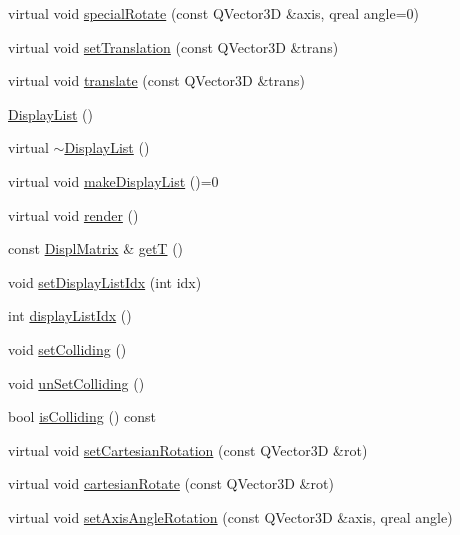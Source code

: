 \begin{DoxyCompactItemize}
\item 
virtual void \hyperlink{class_robot_model_1_1_display_list_abd15964fcf47dbfdcb06d89517871152}{specialRotate} (const QVector3D \&axis, qreal angle=0)
\item 
virtual void \hyperlink{class_robot_model_1_1_display_list_a6c9c1298e237ab25037ad9d7163b118c}{setTranslation} (const QVector3D \&trans)
\item 
virtual void \hyperlink{class_robot_model_1_1_display_list_a6eb574d1f9929d9e2141dbacdeeb1b6a}{translate} (const QVector3D \&trans)
\item 
\hyperlink{class_robot_model_1_1_display_list_a4791b78bf5b3ce2edb821fd9318b7117}{DisplayList} ()
\item 
virtual \hyperlink{class_robot_model_1_1_display_list_a4f3dfbc4d5278bf34ce02738a55af6b7}{$\sim$DisplayList} ()
\item 
virtual void \hyperlink{class_robot_model_1_1_display_list_a842de97924298c7363e50aebd69e5a50}{makeDisplayList} ()=0
\item 
virtual void \hyperlink{class_robot_model_1_1_display_list_ae1e118fc2339bdcaed1f39bd3b65ab32}{render} ()
\item 
const \hyperlink{class_robot_model_1_1_displ_matrix}{DisplMatrix} \& \hyperlink{class_robot_model_1_1_display_list_a2e08e72148fc8bb77a693b769a16711a}{getT} ()
\item 
void \hyperlink{class_robot_model_1_1_display_list_a78c642f12487ea830475a0e860aeee38}{setDisplayListIdx} (int idx)
\item 
int \hyperlink{class_robot_model_1_1_display_list_a2c405729d9a5d904b9c292fd87c3be05}{displayListIdx} ()
\item 
void \hyperlink{class_robot_model_1_1_display_list_aab3355867d2a992c208f2173fc29e221}{setColliding} ()
\item 
void \hyperlink{class_robot_model_1_1_display_list_a7440037838409ae852e02183245b338d}{unSetColliding} ()
\item 
bool \hyperlink{class_robot_model_1_1_display_list_a32f1a046e32b479110977c5efec41cc3}{isColliding} () const 
\item 
virtual void \hyperlink{class_robot_model_1_1_display_list_a7d52ea010f54755bcb3bfae9e26dd0c2}{setCartesianRotation} (const QVector3D \&rot)
\item 
virtual void \hyperlink{class_robot_model_1_1_display_list_a023ba88eaac38b26dc9ea6a358467637}{cartesianRotate} (const QVector3D \&rot)
\item 
virtual void \hyperlink{class_robot_model_1_1_display_list_a56a652740c494995c0ff55d1a5fd896d}{setAxisAngleRotation} (const QVector3D \&axis, qreal angle)

\end{DoxyCompactItemize}
